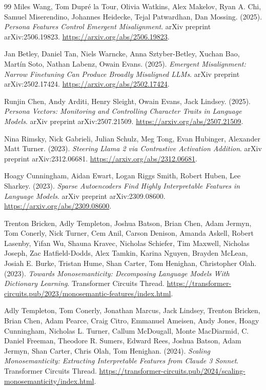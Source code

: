 \documentclass[10pt,a4paper]{article}
\begin{document}
\begin{thebibliography}{99}
Miles Wang, Tom Dupré la Tour, Olivia Watkins, Alex Makelov, Ryan A. Chi, Samuel Miserendino, Johannes Heidecke, Tejal Patwardhan, Dan Mossing. (2025). \textit{Persona Features Control Emergent Misalignment}. arXiv preprint arXiv:2506.19823. \url{https://arxiv.org/abs/2506.19823}.

Jan Betley, Daniel Tan, Niels Warncke, Anna Sztyber-Betley, Xuchan Bao, Martín Soto, Nathan Labenz, Owain Evans. (2025). \textit{Emergent Misalignment: Narrow Finetuning Can Produce Broadly Misaligned LLMs}. arXiv preprint arXiv:2502.17424. \url{https://arxiv.org/abs/2502.17424}.

Runjin Chen, Andy Arditi, Henry Sleight, Owain Evans, Jack Lindsey. (2025). \textit{Persona Vectors: Monitoring and Controlling Character Traits in Language Models}. arXiv preprint arXiv:2507.21509. \url{https://arxiv.org/abs/2507.21509}.

Nina Rimsky, Nick Gabrieli, Julian Schulz, Meg Tong, Evan Hubinger, Alexander Matt Turner. (2023). \textit{Steering Llama 2 via Contrastive Activation Addition}. arXiv preprint arXiv:2312.06681. \url{https://arxiv.org/abs/2312.06681}.

Hoagy Cunningham, Aidan Ewart, Logan Riggs Smith, Robert Huben, Lee Sharkey. (2023). \textit{Sparse Autoencoders Find Highly Interpretable Features in Language Models}. arXiv preprint arXiv:2309.08600. \url{https://arxiv.org/abs/2309.08600}.

Trenton Bricken, Adly Templeton, Joshua Batson, Brian Chen, Adam Jermyn, Tom Conerly, Nick Turner, Cem Anil, Carson Denison, Amanda Askell, Robert Lasenby, Yifan Wu, Shauna Kravec, Nicholas Schiefer, Tim Maxwell, Nicholas Joseph, Zac Hatfield-Dodds, Alex Tamkin, Karina Nguyen, Brayden McLean, Josiah E. Burke, Tristan Hume, Shan Carter, Tom Henighan, Christopher Olah. (2023). \textit{Towards Monosemanticity: Decomposing Language Models With Dictionary Learning}. Transformer Circuits Thread. \url{https://transformer-circuits.pub/2023/monosemantic-features/index.html}.

Adly Templeton, Tom Conerly, Jonathan Marcus, Jack Lindsey, Trenton Bricken, Brian Chen, Adam Pearce, Craig Citro, Emmanuel Ameisen, Andy Jones, Hoagy Cunningham, Nicholas L. Turner, Callum McDougall, Monte MacDiarmid, C. Daniel Freeman, Theodore R. Sumers, Edward Rees, Joshua Batson, Adam Jermyn, Shan Carter, Chris Olah, Tom Henighan. (2024). \textit{Scaling Monosemanticity: Extracting Interpretable Features from Claude 3 Sonnet}. Transformer Circuits Thread. \url{https://transformer-circuits.pub/2024/scaling-monosemanticity/index.html}.


\end{thebibliography}
\end{document}
